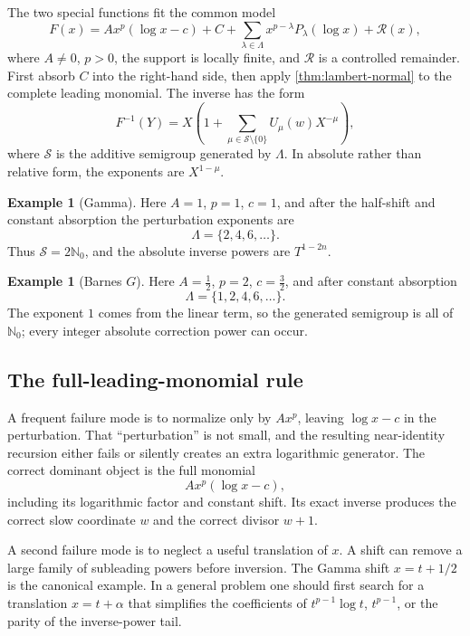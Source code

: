 \documentclass[11pt]{article}
\theoremstyle{definition}
\newtheorem{example}[theorem]{Example}
\theoremstyle{remark}
\newcommand{\N}{\mathbb N}
\newcommand{\calS}{\mathcal S}
\begin{document}
The two special functions fit the common model
\begin{equation}\label{eq:general-forward-class}
 F(x)=A x^p(\log x-c)+C
 +\sum_{\lambda\in\Lambda}x^{p-\lambda}P_\lambda(\log x)
 +\mathcal R(x),
\end{equation}
where \(A\ne0\), \(p>0\), the support is locally finite, and
\(\mathcal R\) is a controlled remainder.  First absorb \(C\) into the right-hand side, then apply \cref{thm:lambert-normal} to the complete leading monomial.  The inverse has the form
\begin{equation}\label{eq:general-inverse-class}
 F^{-1}(Y)=X\left(1+
 \sum_{\mu\in\calS\setminus\{0\}}U_\mu(w)X^{-\mu}\right),
\end{equation}
where \(\calS\) is the additive semigroup generated by \(\Lambda\).  In absolute rather than relative form, the exponents are \(X^{1-\mu}\).

\begin{example}[Gamma]
Here \(A=1\), \(p=1\), \(c=1\), and after the half-shift and constant absorption the perturbation exponents are
\[
 \Lambda=\{2,4,6,\ldots\}.
\]
Thus \(\calS=2\N_0\), and the absolute inverse powers are
\(T^{1-2n}\).
\end{example}

\begin{example}[Barnes \(G\)]
Here \(A=\tfrac12\), \(p=2\), \(c=\tfrac32\), and after constant absorption
\[
 \Lambda=\{1,2,4,6,\ldots\}.
\]
The exponent \(1\) comes from the linear term, so the generated semigroup is all of \(\N_0\); every integer absolute correction power can occur.
\end{example}

\subsection{The full-leading-monomial rule}

A frequent failure mode is to normalize only by \(A x^p\), leaving
\(\log x-c\) in the perturbation.  That ``perturbation'' is not small, and the resulting near-identity recursion either fails or silently creates an extra logarithmic generator.  The correct dominant object is the full monomial
\[
 A x^p(\log x-c),
\]
including its logarithmic factor and constant shift.  Its exact inverse produces the correct slow coordinate \(w\) and the correct divisor \(w+1\).

A second failure mode is to neglect a useful translation of \(x\).  A shift can remove a large family of subleading powers before inversion.  The Gamma shift \(x=t+1/2\) is the canonical example.  In a general problem one should first search for a translation
\(x=t+\alpha\) that simplifies the coefficients of \(t^{p-1}\log t\),
\(t^{p-1}\), or the parity of the inverse-power tail.
\end{document}
